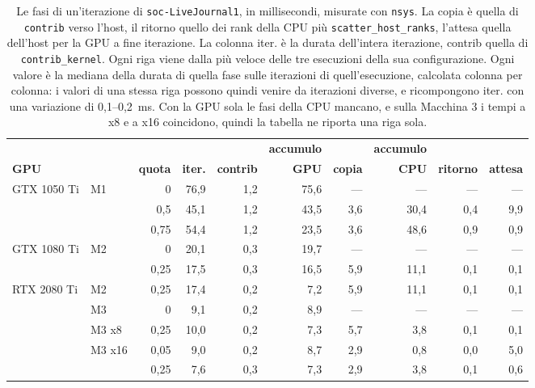 \documentclass[11pt,a4paper]{article}
\begin{document}
\begin{table}[h]
\centering
\caption{Le fasi di un'iterazione di \texttt{soc-LiveJournal1}, in
millisecondi, misurate con \texttt{nsys}. La copia
è quella di \texttt{contrib} verso l'host, il ritorno quello dei rank della
CPU più \texttt{scatter\_host\_ranks}, l'attesa quella dell'host per la GPU a
fine iterazione. La colonna iter. è la durata dell'intera iterazione,
contrib quella di \texttt{contrib\_kernel}. Ogni riga viene dalla più
veloce delle tre esecuzioni della sua configurazione. Ogni valore è la
mediana della durata di quella fase sulle iterazioni di quell'esecuzione,
calcolata colonna per colonna: i valori di una
stessa riga possono quindi venire da iterazioni diverse, e ricompongono
iter. con una variazione di 0,1--0,2~ms. Con la GPU sola le fasi della CPU
mancano, e sulla Macchina 3 i tempi a x8 e a x16 coincidono, quindi
la tabella ne riporta una riga sola.}
\label{tab:fasi}
\small
\setlength{\tabcolsep}{4pt}
\begin{tabular}{@{}llrrrrrrrr@{}}
\toprule
 & & & & & \textbf{accumulo} & & \textbf{accumulo} & & \\
\textbf{GPU} & & \textbf{quota} & \textbf{iter.} & \textbf{contrib} &
\textbf{GPU} & \textbf{copia} & \textbf{CPU} & \textbf{ritorno} &
\textbf{attesa} \\
\midrule
GTX 1050 Ti & M1     & 0    & 76,9 & 1,2 & 75,6 & ---  & ---  & ---  & ---  \\
            &        & 0,5  & 45,1 & 1,2 & 43,5 & 3,6  & 30,4 & 0,4  & 9,9  \\
            &        & 0,75 & 54,4 & 1,2 & 23,5 & 3,6  & 48,6 & 0,9  & 0,9  \\
\addlinespace
GTX 1080 Ti & M2     & 0    & 20,1 & 0,3 & 19,7 & ---  & ---  & ---  & ---  \\
            &        & 0,25 & 17,5 & 0,3 & 16,5 & 5,9  & 11,1 & 0,1  & 0,1  \\
\addlinespace
RTX 2080 Ti & M2     & 0,25 & 17,4 & 0,2 & 7,2  & 5,9  & 11,1 & 0,1  & 0,1  \\
            & M3     & 0    & 9,1  & 0,2 & 8,9  & ---  & ---  & ---  & ---  \\
            & M3 x8  & 0,25 & 10,0 & 0,2 & 7,3  & 5,7  & 3,8  & 0,1  & 0,1  \\
            & M3 x16 & 0,05 & 9,0  & 0,2 & 8,7  & 2,9  & 0,8  & 0,0  & 5,0  \\
            &        & 0,25 & 7,6  & 0,3 & 7,3  & 2,9  & 3,8  & 0,1  & 0,6  \\
\bottomrule
\end{tabular}
\end{table}
\end{document}
